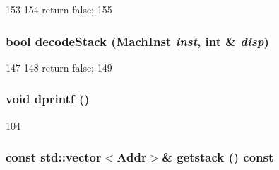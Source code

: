 \begin{DoxyCode}
153     {
154         return false;
155     }
\end{DoxyCode}
\hypertarget{classArmISA_1_1StackTrace_a61ba7618f77dc6e62d7b0baf6273130c}{
\subsubsection[{decodeStack}]{\setlength{\rightskip}{0pt plus 5cm}bool decodeStack ({\bf MachInst} {\em inst}, \/  int \& {\em disp})}}
\label{classArmISA_1_1StackTrace_a61ba7618f77dc6e62d7b0baf6273130c}



\begin{DoxyCode}
147     {
148         return false;
149     }
\end{DoxyCode}
\hypertarget{classArmISA_1_1StackTrace_a70fdc8802b54b4244889a2d3553405d5}{
\subsubsection[{dprintf}]{\setlength{\rightskip}{0pt plus 5cm}void dprintf ()}}
\label{classArmISA_1_1StackTrace_a70fdc8802b54b4244889a2d3553405d5}



\begin{DoxyCode}
104 {}
\end{DoxyCode}
\hypertarget{classArmISA_1_1StackTrace_aceb93ba31a3756aca859b4643efeeb46}{
\subsubsection[{getstack}]{\setlength{\rightskip}{0pt plus 5cm}const {\bf std::vector}$<${\bf Addr}$>$\& getstack () const}}
\label{classArmISA_1_1StackTrace_aceb93ba31a3756aca859b4643efeeb46}



